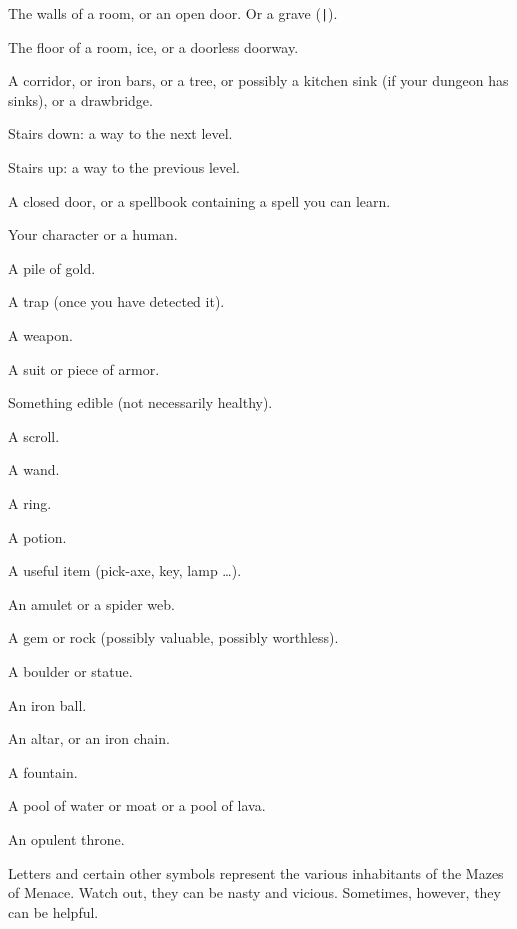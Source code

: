 \blist{}
\item[\tb{- {\rm and} |}]
The walls of a room, or an open door.  Or a grave ({\tt |}).
\item[\tb{.}]
The floor of a room, ice, or a doorless doorway.
\item[\tb{\#}]
A corridor, or iron bars, or a tree, or possibly a kitchen sink (if
your dungeon has sinks), or a drawbridge.
\item[\tb{>}]
Stairs down: a way to the next level.
\item[\tb{<}]
Stairs up: a way to the previous level.
\item[\tb{+}]
A closed door, or a spellbook containing a spell you can learn.
\item[\tb{@}]
Your character or a human.
\item[\tb{\$}]
A pile of gold.
\item[\tb{\^}]
A trap (once you have detected it).
\item[\tb{)}]
A weapon.
\item[\tb{[}]
A suit or piece of armor.
\item[\tb{\%}]
Something edible (not necessarily healthy).
\item[\tb{?}]
A scroll.
\item[\tb{/}]
A wand.
\item[\tb{=}]
A ring.
\item[\tb{!}]
A potion.
\item[\tb{(}]
A useful item (pick-axe, key, lamp \ldots).
\item[\tb{"}]
An amulet or a spider web.
\item[\tb{*}]
A gem or rock (possibly valuable, possibly worthless).
\item[\tb{`}]
A boulder or statue.
\item[\tb{0}]
An iron ball.
\item[\tb{_}]
An altar, or an iron chain.
\item[\tb{\{}]
A fountain.
\item[\tb{\}}]
A pool of water or moat or a pool of lava.
\item[\tb{$\backslash$}]
An opulent throne.
\item[\tb{a-zA-Z {\rm \& other symbols}}]
Letters and certain other symbols represent the various inhabitants
of the Mazes of Menace.  Watch out, they can be nasty and vicious.
Sometimes, however, they can be helpful.

